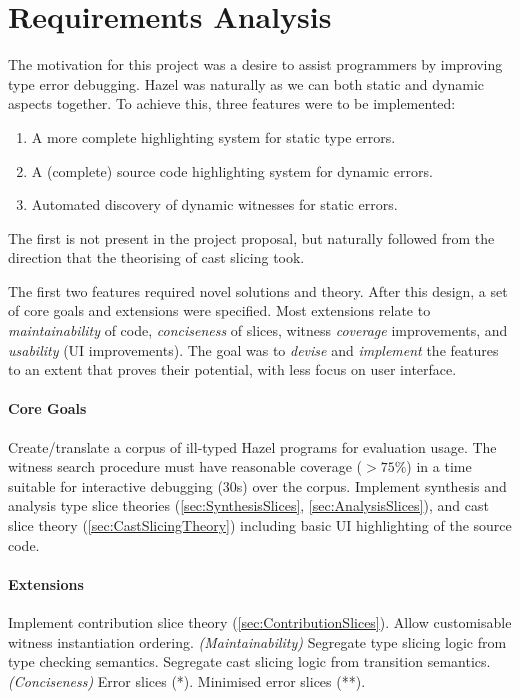 \section{Requirements Analysis}\label{sec:RequirementAnalysis}
The motivation for this project was a desire to assist programmers by improving type error debugging. Hazel was naturally as we can both static and dynamic aspects together. To achieve this, three features were to be implemented:
\begin{enumerate}
\item A more complete highlighting system for static type errors.
\item A (complete) source code highlighting system for dynamic errors.
\item Automated discovery of dynamic witnesses for static errors.
\end{enumerate}
The first is not present in the project proposal, but naturally followed from the direction that the theorising of cast slicing took.

The first two features required novel solutions and theory. After this design, a set of core goals and extensions were specified. Most extensions relate to \textit{maintainability} of code, \textit{conciseness} of slices, witness \textit{coverage} improvements, and \textit{usability} (UI improvements). The goal was to \textit{devise} and \textit{implement} the features to an extent that proves their potential, with less focus on user interface.

\paragraph{{\color{red} Core Goals}} Create/translate a corpus of ill-typed Hazel programs for evaluation usage. The witness search procedure must have reasonable coverage ($>75\%$) in a time suitable for interactive debugging (30s) over the corpus. Implement synthesis and analysis type slice theories (\cref{sec:SynthesisSlices}, \ref{sec:AnalysisSlices}), and cast slice theory (\cref{sec:CastSlicingTheory}) including basic UI highlighting of the source code.

\paragraph{{\color{orange} Extensions}} Implement contribution slice theory (\cref{sec:ContributionSlices}). Allow customisable witness instantiation ordering. \textit{(Maintainability)} Segregate type slicing logic from type checking semantics. Segregate cast slicing logic from transition semantics. \textit{(Conciseness)} Error slices (*). Minimised error slices (**). 

